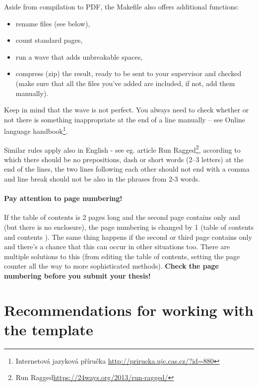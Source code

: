 Aside from compilation to PDF, the Makefile also offers additional functions:
\begin{itemize}
  \item rename files (see below),
  \item count standard pages,
  \item run a wave that adds unbreakable spaces,
  \item compress (zip) the result, ready to be sent to your supervisor and checked (make sure that all the files you've added are included, if not, add them manually).
\end{itemize}

Keep in mind that the wave is not perfect. You always need to check whether or not there is something inappropriate at the end of a line manually -- see Online language handbook\footnote{Internetová jazyková příručka \url{http://prirucka.ujc.cas.cz/?id=880}}.

Similar rules apply also in English - see eg. article Run Ragged\footnote{Run Ragged\url{https://24ways.org/2013/run-ragged/}}, according to which there should be no prepositions, dash or short words (2--3 letters) at the end of the lines, the two lines following each other should not end with a comma and line break should not be also in the phrases from 2-3 words.

\paragraph {Pay attention to page numbering!} If the table of contents is 2 pages long and the second page contains only  and  (but there is no enclosure), the page numbering is changed by 1 (table of contents and contents ). The same thing happens if the second or third page contains only  and there's a chance that this can occur in other situations too. There are multiple solutions to this (from editing the table of contents, setting the page counter all the way to more sophisticated methods). \textbf{Check the page numbering before you submit your thesis!}

\section{Recommendations for working with the template}

